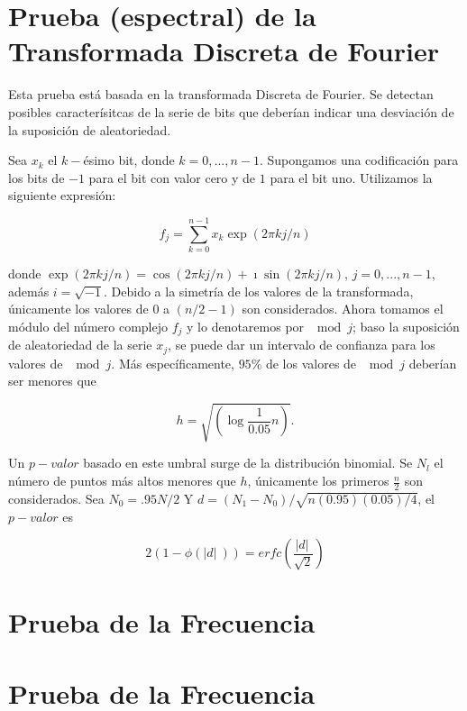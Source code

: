\section*{Prueba (espectral) de la Transformada Discreta de Fourier}
Esta prueba está basada en la transformada Discreta de Fourier. Se detectan posibles caracterísitcas de la serie de bits que deberían indicar una desviación de la suposición de aleatoriedad.

Sea $x_{k}$ el $k-$ésimo bit, donde $k = 0, ... ,n-1$. Supongamos una codificación para los bits de $-1$ para el bit con valor cero y de $1$ para el bit uno. Utilizamos la siguiente expresión:

\begin{equation}
f_{j}= \sum_{k=0}^{n-1}x_{k} \exp \left(  2 \pi k j/n    \right)
\end{equation}

donde $\exp (  2 \pi kj/n ) = \cos  (  2 \pi  kj/n )  + \imath \sin (  2 \pi kj/n )  $, $j = 0, ... ,n-1$, además $ i = \sqrt{-1}$. Debido a la simetría de los valores de la transformada, únicamente los valores de $0$ a $(n/2 -1)$ son considerados. Ahora tomamos el módulo del número complejo $f_{j}$ y lo denotaremos por $\mod{j}$; baso la suposición de aleatoriedad de la serie $x_{j}$, se puede dar un intervalo de confianza para los valores de $\mod{j}$. Más específicamente, $95\%$ de los valores de $\mod{j}$ deberían ser menores que

\begin{equation}
h = \sqrt{\left( \log \frac{1}{0.05}n  \right)}.
\end{equation}

Un $p-valor$ basado en este umbral surge de la distribución binomial. Se $N_{l}$ el número de puntos más altos  menores que $h$, únicamente los primeros $\frac{n}{2}$ son considerados. Sea $N_{0} = .95N/2$ Y $d= (N_{1}- N_{0}) / \sqrt{n(0.95)(0.05)/4}$, el $p-valor$ es

\begin{equation}
2 \left( 1 - \phi \left(  \lvert d \rvert\ \right)  \right) = erfc \left( \frac{\lvert d \rvert\ }{ \sqrt{2}} \right)
\end{equation} 


\section*{Prueba de la Frecuencia}
\section*{Prueba de la Frecuencia}
